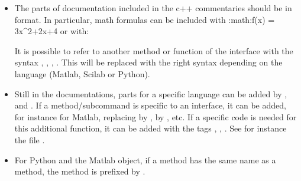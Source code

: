 \documentclass[a4paper,11pt,english]{sphinxmanual}
\begin{document}
\begin{itemize}
\item {} 
The parts of documentation included in the c++ commentaries should be in
 format. In particular, math formulas can be included
with :math:\textasciigrave{}f(x) = 3x\textasciicircum{}2+2x+4\textasciigrave{} or with:

\begin{sphinxVerbatim}[commandchars=\\\{\}]
 

    
\end{sphinxVerbatim}

It is possible to refer to another method or function of the interface
with the syntax ,
, ,
. This will be replaced with
the right syntax depending on the language (Matlab, Scilab or Python).

\item {} 
Still in the documentations, parts for a specific language can be added by
,  and
.
If a method/sub\sphinxhyphen{}command is specific to an interface, it can be added,
for instance for Matlab,
replacing  by ,  by , etc.
If a specific code is needed for this additional function, it can be added
with the tags , , . See
for instance the file .

\item {} 
For Python and the Matlab object, if a  method has the same name as
a  method, the  method is prefixed by .

\end{itemize}
\end{document}
